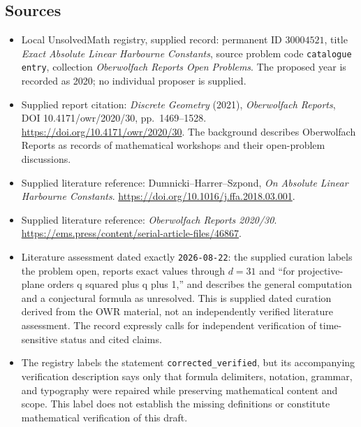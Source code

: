 \documentclass[11pt]{article}
\begin{document}
\subsection{Sources}
\begin{itemize}
\item Local UnsolvedMath registry, supplied record: permanent ID \(30004521\), title \emph{Exact Absolute Linear Harbourne Constants}, source problem code \texttt{catalogue entry}, collection \emph{Oberwolfach Reports Open Problems}. The proposed year is recorded as 2020; no individual proposer is supplied.
\item Supplied report citation: \emph{Discrete Geometry} (2021), \emph{Oberwolfach Reports}, DOI 10.4171/owr/2020/30, pp.\ 1469--1528. \url{https://doi.org/10.4171/owr/2020/30}. The background describes Oberwolfach Reports as records of mathematical workshops and their open-problem discussions.
\item Supplied literature reference: Dumnicki--Harrer--Szpond, \emph{On Absolute Linear Harbourne Constants}. \url{https://doi.org/10.1016/j.ffa.2018.03.001}.
\item Supplied literature reference: \emph{Oberwolfach Reports 2020/30}. \url{https://ems.press/content/serial-article-files/46867}.
\item Literature assessment dated exactly \texttt{2026-08-22}: the supplied curation labels the problem open, reports exact values through \(d=31\) and ``for projective-plane orders q squared plus q plus 1,'' and describes the general computation and a conjectural formula as unresolved. This is supplied dated curation derived from the OWR material, not an independently verified literature assessment. The record expressly calls for independent verification of time-sensitive status and cited claims.
\item The registry labels the statement \texttt{corrected\_verified}, but its accompanying verification description says only that formula delimiters, notation, grammar, and typography were repaired while preserving mathematical content and scope. This label does not establish the missing definitions or constitute mathematical verification of this draft.
\end{itemize}
\end{document}
